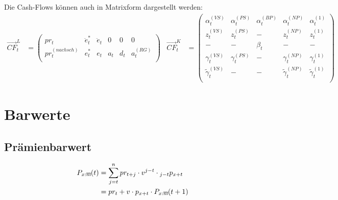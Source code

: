 \documentclass[a4paper,10pt]{article}
\makeatletter
\newcommand{\xn}{{\act[x]{n}}}
\DeclareRobustCommand{\act}[2][]{%
\def\arraystretch{0}%
\setlength\arraycolsep{0.5pt}%
\setlength\arrayrulewidth{0.5pt}%
\setbox0=\hbox{$\scriptstyle#1\ifx#1\empty{asdf}\else:\fi#2$}%
\begin{array}[b]{*2{@{}>{\scriptstyle}c}|}
\cline{2-2}%
\rule[1.25pt]{0pt}{\ht0}%
#1\ifx#1\empty\else:\fi & #2%
\end{array}%
}
\makeatother
\begin{document}
Die Cash-Flows können auch in Matrixform dargestellt werden:
\begin{align*}
%
 \overrightarrow{CF}^L_t &= \left(
 \begin{matrix} %
pr_t & \ddot{e}_t^{*} & \ddot{e}_t & 0 & 0 & 0 \\
pr^{(nachsch)}_t & e_t^{*} & e_t & a_t & d_t & a_t^{(RG)}\\
\end{matrix}
 \right)
%
&
 \overrightarrow{CF}^K_t &= \left(
 \begin{matrix}
\alpha^{(VS)}_t & \alpha^{(PS)}_t  & \alpha^{(BP)}_t & \alpha^{(NP)}_t & \alpha^{(1)}_t\\
z^{(VS)}_t & z^{(PS)}_t  & - & z^{(NP)}_t & z^{(1)}_t\\
- & - & \beta_t & - & - \\
\gamma^{(VS)}_t & \gamma^{(PS)}_t & -  & \gamma^{(NP)}_t & \gamma^{(1)}_t\\
\widetilde{\gamma}^{(VS)}_t & - & - & \widetilde{\gamma}^{(NP)}_t & \widetilde{\gamma}^{(1)}_t\\
 \end{matrix}
 \right)
\end{align*}


\pagebreak

\section{Barwerte}

\subsection{Prämienbarwert}

\begin{align*}
P_\xn(t) &= \sum_{j=t}^n pr_{t+j} \cdot v^{j-t}  \cdot {}_{j-t}p_{x+t}\\
	  &= pr_{t} + v \cdot p_{x+t} \cdot P_\xn(t+1)
\end{align*}
\end{document}
